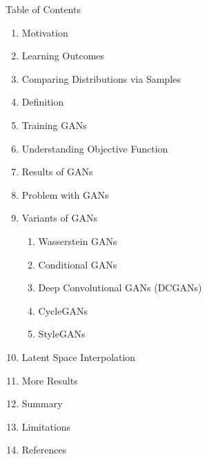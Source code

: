 \begin{frame}[allowframebreaks]{Table of Contents}
\begin{enumerate}
    \item Motivation
    \item Learning Outcomes
    \item Comparing Distributions via Samples
    \item Definition
    \item Training GANs
    \item Understanding Objective Function
    \item Results of GANs
    \item Problem with GANs
    \item Variants of GANs
    \begin{enumerate}
        \item Wasserstein GANs
        \item Conditional GANs
        \item Deep Convolutional GANs (DCGANs)
        \item CycleGANs
        \item StyleGANs
    \end{enumerate}
    \item Latent Space Interpolation
    \item More Results
    \item Summary
    \item Limitations
    \item References
\end{enumerate}
\end{frame}